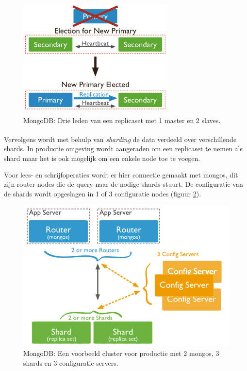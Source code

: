 \begin{figure}[!htb]
	    \centering
    \includegraphics[width=0.7\textwidth]{img/mongodb-replica-set-trigger-election.png}
    \caption{MongoDB: Drie leden van een replicaset met 1 master en 2 slaves. \cite{mongodb-replicaset}}
    \label{fig:mongodb-replicaset-vote}
\end{figure}

\paragraph{} Vervolgens wordt met behulp van \textit{sharding} de data verdeeld over verschillende shards. In productie omgeving wordt aangeraden om een replicaset te nemen als shard maar het is ook mogelijk om een enkele node toe te voegen. 

Voor lees- en schrijfoperaties wordt er hier connectie gemaakt met mongos, dit zijn router nodes die de query naar de nodige shards stuurt. De configuratie van de shards wordt opgeslagen in 1 of 3 configuratie nodes (figuur \ref{fig:mongodb-shards}). 

\begin{figure}[!htb]
	    \centering
    \includegraphics[width=\textwidth]{img/mongo-sharded-cluster-production-architecture.png}
    \caption{MongoDB: Een voorbeeld cluster voor productie met 2 mongos, 3 shards en 3 configuratie servers. \cite{mongodb-shard}}
    \label{fig:mongodb-shards}
\end{figure}

